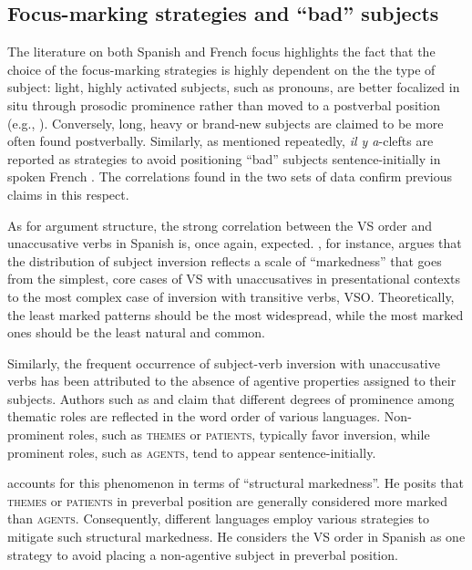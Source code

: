 \subsection{Focus-marking strategies and ``bad” subjects} \label{sub:6.10.3}
The literature on both Spanish and French focus highlights the fact that the choice of the focus-marking strategies is highly dependent on the the type of subject: light, highly activated subjects, such as pronouns, are better focalized in situ through prosodic prominence rather than moved to a postverbal position (e.g., \cite{gabriel2007fokus}). Conversely, long, heavy or brand-new subjects are claimed to be more often found postverbally. Similarly, as mentioned repeatedly, \textit{il y a}-clefts are reported as strategies to avoid positioning ``bad” subjects sentence-initially in spoken French \parencite{lambrecht2010constraints, Karssenberg+2018}. The correlations found in the two sets of data confirm previous claims in this respect.

As for argument structure, the strong correlation between the VS order and unaccusative verbs in Spanish is, once again, expected. \textcite{leonetti201724}, for instance, argues that  the distribution of subject inversion reflects a scale of “markedness” that goes from the simplest, core cases of VS with unaccusatives in presentational contexts to the most complex case of inversion with transitive verbs, VSO. Theoretically, the least marked patterns should be the most widespread, while the most marked ones should be the least natural and common.

Similarly, the frequent occurrence of subject-verb inversion with unaccusative verbs has been attributed to the absence of agentive properties assigned to their subjects. Authors such as \textcite{contreras1978orden} and \textcite{gutierrez2013structural} claim that different degrees of prominence among thematic roles are reflected in the word order of various languages. Non-prominent roles, such as \textsc{themes} or \textsc{patients}, typically favor inversion, while prominent roles, such as \textsc{agents}, tend to appear sentence-initially.

\textcite{gutierrez2013structural} accounts for this phenomenon in terms of ``structural markedness”. He posits that \textsc{themes} or \textsc{patients} in preverbal position are generally considered more marked than \textsc{agents}. Consequently, different languages employ various strategies to mitigate such structural markedness. He considers the VS order in Spanish as one strategy to avoid placing a non-agentive subject in preverbal position.

